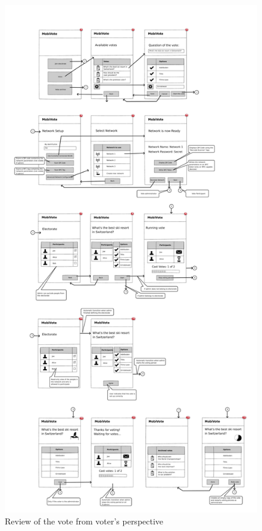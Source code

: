 \documentclass[numbers=noenddot, abstract=on, a4paper, headsepline,
footsepline, oneside, draft=off]{scrreprt}
\begin{document}
\begin{figure}[htbp]
	\centering
	\includegraphics[height=.4\textheight]{img/voter_review}
	\caption{Review of the vote from voter's perspective}
	\label{fig:voter_review}
\end{figure}
\end{document}
